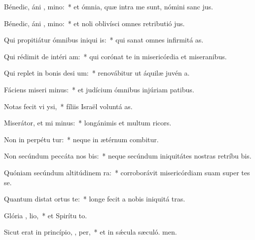 \item Bénedic, áni , mino:~* et ómnia, quæ intra me sunt, nómini sanc jus.
\item Bénedic, áni , mino:~* et noli oblivísci omnes retributió jus.
\item Qui propitiátur ómnibus iniqui is:~* qui sanat omnes infirmitá as.
\item Qui rédimit de intéri  am:~* qui corónat te in misericórdia et miseranibus.
\item Qui replet in bonis desi um:~* renovábitur ut áquilæ juvén a.
\item Fáciens miseri minus:~* et judícium ómnibus injúriam patibus.
\item Notas fecit vi  ysi,~* fíliis Israël voluntá as.
\item Miserátor, et mi minus:~* longánimis et multum ricors.
\item Non in perpétu tur:~* neque in ætérnum combitur.
\item Non secúndum peccáta nos  bis:~* neque secúndum iniquitátes nostras retríbu bis.
\item Quóniam secúndum altitúdinem   ra:~* corroborávit misericórdiam suam super tes se.
\item Quantum distat ortus  te:~* longe fecit a nobis iniquitá tras.
\item Glória ,  lio,~* et Spirítu to.
\item Sicut erat in princípio,  ,  per,~* et in sǽcula sæculó. men.
